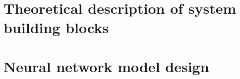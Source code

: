 \documentclass[fleqn,a4paper,12pt]{report}
\begin{document}







%
%
%
%

%

\chapter{ Theoretical description of system building blocks}


\chapter{ Neural network model design}


%
%
%
%



\begingroup
\raggedright


\endgroup
\end{document}
